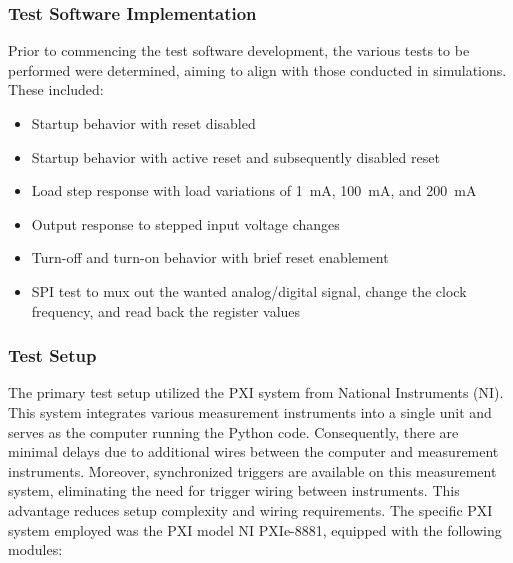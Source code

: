 \subsubsection{Test Software Implementation}
Prior to commencing the test software development, the various tests to be performed were determined, aiming to align with those conducted in simulations. These included:
\begin{itemize}
    \item Startup behavior with reset disabled
    \item Startup behavior with active reset and subsequently disabled reset
    \item Load step response with load variations of \qty{1}{\milli\ampere}, \qty{100}{\milli\ampere}, and \qty{200}{\milli\ampere}
    \item Output response to stepped input voltage changes
    \item Turn-off and turn-on behavior with brief reset enablement
    \item SPI test to mux out the wanted analog/digital signal, change the clock frequency, and read back the register values
\end{itemize}

\subsubsection{Test Setup}
The primary test setup utilized the PXI system from National Instruments (NI). This system integrates various measurement instruments into a single unit and serves as the computer running the Python code. Consequently, there are minimal delays due to additional wires between the computer and measurement instruments. Moreover, synchronized triggers are available on this measurement system, eliminating the need for trigger wiring between instruments. This advantage reduces setup complexity and wiring requirements. The specific PXI system employed was the PXI model \glqq{}NI PXIe-8881\grqq{}, equipped with the following modules:


